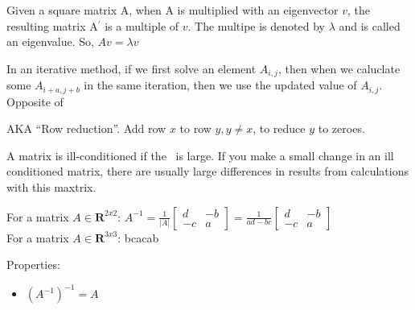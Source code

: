\begin{definition}[Eigenvector]\label{eigen}
    Given a square matrix A, when A is multiplied with an eigenvector $v$,
    the resulting matrix A${^\prime}$ is a multiple of $v$.
    The multipe is denoted by $\lambda$ and is called an eigenvalue.
    So, $Av = \lambda v$

\end{definition}

\begin{definition}\label{forwardsubstituion}
    In an iterative method, if we first solve an element $A_{i,j}$,
    then when we caluclate some $A_{i+a, j+b}$ in the same iteration, then we
    use the updated value of $A_{i,j}$. Opposite
    of~

\end{definition}

\begin{definition}
    AKA ``Row reduction''. Add row $x$ to row $y, y \neq x$, to reduce $y$ to 
    zeroes.

\end{definition}

\begin{definition}
    A matrix is ill-conditioned if the~ is large.
    If you make a small change in an ill conditioned matrix, there are usually
    large differences in results from calculations with this maxtrix.

\end{definition}

\begin{definition}[Inverse]
    For a matrix $A \in \mathbf{R}^{2x2}$:
    $A^{-1} = \frac{1}{|A|}
        \begin{bmatrix}
            d & -b \\
            -c & a
        \end{bmatrix}
    = \frac{1}{ad - bc}
        \begin{bmatrix}
            d & -b \\
            -c & a
        \end{bmatrix}
    $\\
    For a matrix $A \in \mathbf{R}^{3x3}$: bcacab

    Properties:
    \begin{itemize}
        \item $(A^{-1})^{-1} = A$
    \end{itemize}
\end{definition}

